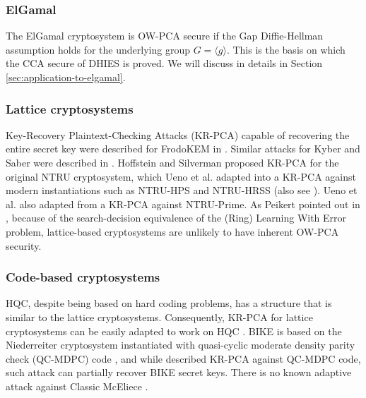 \documentclass[runningheads]{llncs}
\begin{document}
\subsubsection{ElGamal} The ElGamal cryptosystem \cite{DBLP:journals/tit/Elgamal85} is OW-PCA secure if the Gap Diffie-Hellman assumption \cite{DBLP:conf/pkc/OkamotoP01} holds for the underlying group $G = \langle g \rangle$. This is the basis on which the CCA secure of DHIES \cite{DBLP:conf/ctrsa/AbdallaBR01} is proved. We will discuss in details in Section \ref{sec:application-to-elgamal}.

\subsubsection{Lattice cryptosystems} Key-Recovery Plaintext-Checking Attacks (KR-PCA) capable of recovering the entire secret key were described for FrodoKEM in \cite{DBLP:conf/crypto/GuoJN20,DBLP:conf/eurocrypt/BaetuDHTV19}. Similar attacks for Kyber and Saber were described in \cite{DBLP:conf/acns/Huguenin-Dumittan20,DBLP:conf/asiacrypt/XagawaIUTH21,DBLP:conf/pqcrypto/GuoM23}. Hoffstein and Silverman \cite{Hoffstein1999} proposed KR-PCA for the original NTRU cryptosystem, which Ueno et al. \cite{DBLP:journals/tches/UenoXTITH22} adapted into a KR-PCA against modern instantiations such as NTRU-HPS and NTRU-HRSS (also see \cite{cryptoeprint:2021/168}). Ueno et al. also adapted from \cite{DBLP:conf/crypto/JaulmesJ00} a KR-PCA against NTRU-Prime. As Peikert pointed out in \cite{cryptoeprint:2014/070}, because of the search-decision equivalence of the (Ring) Learning With Error problem, lattice-based cryptosystems are unlikely to have inherent OW-PCA security.

\subsubsection{Code-based cryptosystems} HQC, despite being based on hard coding problems, has a structure that is similar to the lattice cryptosystems. Consequently, KR-PCA for lattice cryptosystems can be easily adapted to work on HQC \cite{DBLP:conf/acns/Huguenin-Dumittan20,DBLP:conf/eurocrypt/BaetuDHTV19}. BIKE is based on the Niederreiter cryptosystem instantiated with quasi-cyclic moderate density parity check (QC-MDPC) code \cite{DBLP:conf/isit/MisoczkiTSB13}, and while \cite{DBLP:conf/asiacrypt/Guo0S16} described KR-PCA against QC-MDPC code, such attack can partially recover BIKE secret keys. There is no known adaptive attack against Classic McEliece  \cite{DBLP:journals/tches/UenoXTITH22}.
\end{document}
